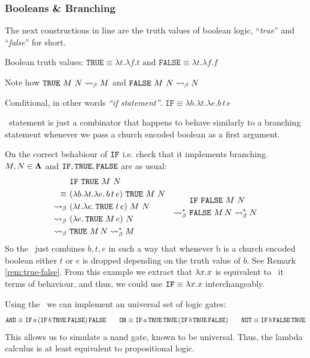 \subsubsection{\centering Booleans \& Branching}
The next constructions in line are the truth values of boolean logic, ``\textit{true}'' and ``\textit{false}'' for short.
\begin{definition} Boolean truth values:
\(
    \texttt{TRUE} \equiv \lambda t.\lambda f. t \text{ and }
    \texttt{FALSE} \equiv \lambda t.\lambda f. f
\)
\end{definition}
\begin{remark}
  \label{rem:true-false}
  Note how $\texttt{TRUE} \ M \ N \mathrel{\leadsto}_\beta M $ and $ \texttt{FALSE} \ M \ N \mathrel{\leadsto}_\beta N $
\end{remark}
\begin{definition} Conditional, in other words \textit{``if statement''}.
  \(
    \texttt{IF} \equiv \lambda b.\lambda t.\lambda e. b\,t\,e \)
\end{definition}
\begin{note}
  \IF \ statement is just a combinator that happens to behave similarly to a branching statement whenever we pass a church encoded boolean as a first argument.
  \end{note}
\begin{example} On the correct behabiour of $\texttt{IF}$ i.e. check that it implements branching. $ M, N \in \mathbf{\Lambda} $ and $ \texttt{IF}, \texttt{TRUE}, \texttt{FALSE}$ are as usual:
  \[
    \begin{aligned}
      & \IF \ \TRUE \ M \ N \\
      \equiv \ & (\la b.\la t.\la e.\, b\, t\, e) \ \TRUE \ M \ N  \\
      \curly \ & (\la t.\la e.\, \TRUE\ t\, e) \ M \ N  \\
      \curly \ & (\la e.\, \TRUE\ M\, e) \ N  \\
      \curly \ & \TRUE\ M\, N \curly^* M 
    \end{aligned}
    \quad
    \begin{aligned}
      & \IF \ \FALSE \ M \ N \\
      \curly^* \ & \FALSE\ M\, N \curly^* N
    \end{aligned}
  \]
  So the \IF \ just combines $b, t, e$ in such a way that whenever b is a church encoded boolean either $t$ or $e$ is dropped depending on the truth value of $b$. See Remark \ref{rem:true-false}. From this example we extract that $ \lambda x . x $ is equivalent to \IF \ it terms of behaviour, and thus, we could use $ \texttt{IF} \equiv \lambda x . x $ interchangeably.
\end{example}
\begin{definition}
  Using the \IF \ we can implement an universal set of logic gates:
\[
    \texttt{AND} \equiv \texttt{IF} \, a \, (\texttt{IF} \, b \, \texttt{TRUE} \, \texttt{FALSE}) \, \texttt{FALSE} \qquad
    \texttt{OR} \equiv \texttt{IF} \, a \, \texttt{TRUE} \, \texttt{TRUE} \, (\texttt{IF} \, b \, \texttt{TRUE} \, \texttt{FALSE}) \qquad
    \texttt{NOT} \equiv \texttt{IF} \, b \, \texttt{FALSE} \, \texttt{TRUE}
\]
This allows us to simulate a nand gate, known to be universal. Thus, the lambda calculus is at least equivalent to propositional logic.
\end{definition}


